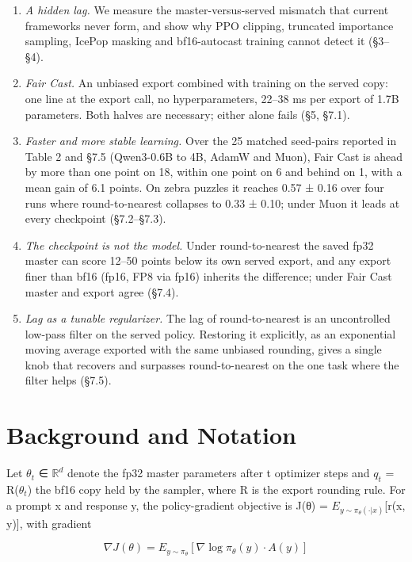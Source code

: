\documentclass[
  10pt,
]{article}
\providecommand{\tightlist}{%
  \setlength{\itemsep}{0pt}\setlength{\parskip}{0pt}}
\begin{document}
\begin{enumerate}
\def\labelenumi{\arabic{enumi}.}
\tightlist
\item
  \emph{A hidden lag.} We measure the master-versus-served mismatch that current frameworks never
  form, and show why PPO clipping, truncated importance sampling, IcePop masking and bf16-autocast
  training cannot detect it (§3--§4).
\item
  \emph{Fair Cast.} An unbiased export combined with training on the served copy: one line at the
  export call, no hyperparameters, 22--38 ms per export of 1.7B parameters. Both halves are
  necessary; either alone fails (§5, §7.1).
\item
  \emph{Faster and more stable learning.} Over the 25 matched seed-pairs reported in Table 2 and
  §7.5 (Qwen3-0.6B to 4B, AdamW and Muon), Fair Cast is ahead by more than one point on 18, within
  one point on 6 and behind on 1, with a mean gain of 6.1 points. On zebra puzzles it reaches 0.57 ±
  0.16 over four runs where round-to-nearest collapses to 0.33 ± 0.10; under Muon it leads at every
  checkpoint (§7.2--§7.3).
\item
  \emph{The checkpoint is not the model.} Under round-to-nearest the saved fp32 master can score
  12--50 points below its own served export, and any export finer than bf16 (fp16, FP8 via fp16)
  inherits the difference; under Fair Cast master and export agree (§7.4).
\item
  \emph{Lag as a tunable regularizer.} The lag of round-to-nearest is an uncontrolled low-pass
  filter on the served policy. Restoring it explicitly, as an exponential moving average exported
  with the same unbiased rounding, gives a single knob that recovers and surpasses round-to-nearest
  on the one task where the filter helps (§7.5).
\end{enumerate}

\section{Background and Notation}\label{background-and-notation}

Let \(\theta_t\) ∈ \(\mathbb{R}^d\) denote the fp32 master parameters after t optimizer steps and
\(q_t\) = R(\(\theta_t\)) the bf16 copy held by the sampler, where R is the export rounding rule.
For a prompt x and response y, the policy-gradient objective is J(θ) =
\(E_{y\sim \pi_\theta(\cdot |x)}\){[}r(x, y){]}, with gradient

\begin{equation}
\nabla J(\theta ) = E_{y\sim \pi_{\theta }}[ \nabla \log \pi_{\theta }(y) \cdot A(y) ]
\end{equation}
\end{document}
